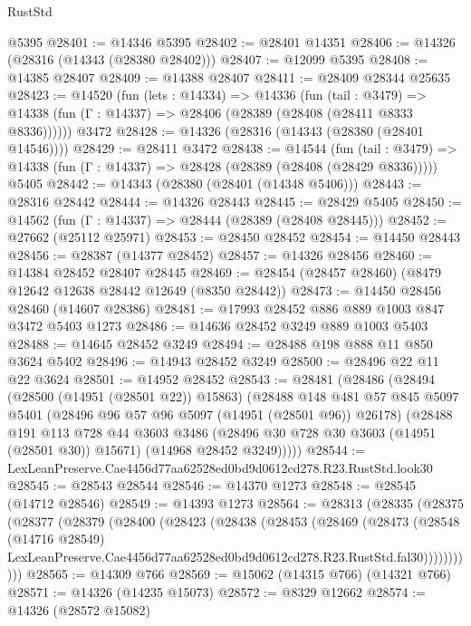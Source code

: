 \begin{lexlean}{RustStd}
\begin{coremodule}
    @5395
@28401 := @14346 @5395
@28402 := @28401 @14351
@28406 := @14326 (@28316 (@14343 (@28380 @28402)))
@28407 := @12099 @5395
@28408 := @14385 @28407
@28409 := @14388 @28407
@28411 := @28409 @28344 @25635
@28423 := @14520
    (fun (lets : @14334) =>
    @14336
      (fun (tail : @3479) =>
      @14338 (fun (Γ : @14337) => @28406 (@28389 (@28408 (@28411 @8333 @8336))))))
    @3472
@28428 := @14326 (@28316 (@14343 (@28380 (@28401 @14546))))
@28429 := @28411 @3472
@28438 := @14544
    (fun (tail : @3479) => @14338 (fun (Γ : @14337) => @28428 (@28389 (@28408 (@28429 @8336)))))
    @5405
@28442 := @14343 (@28380 (@28401 (@14348 @5406)))
@28443 := @28316 @28442
@28444 := @14326 @28443
@28445 := @28429 @5405
@28450 := @14562 (fun (Γ : @14337) => @28444 (@28389 (@28408 @28445)))
@28452 := @27662 (@25112 @25971)
@28453 := @28450 @28452
@28454 := @14450 @28443
@28456 := @28387 (@14377 @28452)
@28457 := @14326 @28456
@28460 := @14384 @28452 @28407 @28445
@28469 := @28454 (@28457 @28460) (@8479 @12642 @12638 @28442 @12649 (@8350 @28442))
@28473 := @14450 @28456 @28460 (@14607 @28386)
@28481 := @17993 @28452 @886 @889 @1003 @847 @3472 @5403 @1273
@28486 := @14636 @28452 @3249 @889 @1003 @5403
@28488 := @14645 @28452 @3249
@28494 := @28488 @198 @888 @11 @850 @3624 @5402
@28496 := @14943 @28452 @3249
@28500 := @28496 @22 @11 @22 @3624
@28501 := @14952 @28452
@28543 := @28481
    (@28486
      (@28494
        (@28500 (@14951 (@28501 @22)) @15863)
        (@28488
          @148
          @481
          @57
          @845
          @5097
          @5401
          (@28496 @96 @57 @96 @5097 (@14951 (@28501 @96)) @26178)
          (@28488
            @191
            @113
            @728
            @44
            @3603
            @3486
            (@28496 @30 @728 @30 @3603 (@14951 (@28501 @30)) @15671)
            (@14968 @28452 @3249)))))
@28544 := LexLeanPreserve.Cae4456d77aa62528ed0bd9d0612cd278.R23.RustStd.look30
@28545 := @28543 @28544
@28546 := @14370 @1273
@28548 := @28545 (@14712 @28546)
@28549 := @14393 @1273
@28564 := @28313
    (@28335
      (@28375
        (@28377
          (@28379
            (@28400
              (@28423
                (@28438
                  (@28453
                    (@28469
                      (@28473
                        (@28548
                          (@14716 @28549)
                          LexLeanPreserve.Cae4456d77aa62528ed0bd9d0612cd278.R23.RustStd.fal30)))))))))))
@28565 := @14309 @766
@28569 := @15062 (@14315 @766) (@14321 @766)
@28571 := @14326 (@14235 @15073)
@28572 := @8329 @12662
@28574 := @14326 (@28572 @15082)

\end{coremodule}
\end{lexlean}
